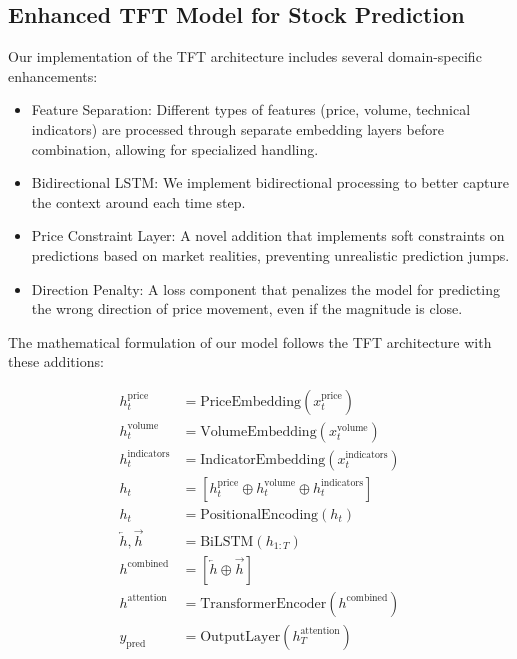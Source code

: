 \documentclass[conference]{IEEEtran}
\begin{document}
\subsection{Enhanced TFT Model for Stock Prediction}
Our implementation of the TFT architecture includes several domain-specific enhancements:

\begin{itemize}
\item Feature Separation: Different types of features (price, volume, technical indicators) are processed through separate embedding layers before combination, allowing for specialized handling.
\item Bidirectional LSTM: We implement bidirectional processing to better capture the context around each time step.
\item Price Constraint Layer: A novel addition that implements soft constraints on predictions based on market realities, preventing unrealistic prediction jumps.
\item Direction Penalty: A loss component that penalizes the model for predicting the wrong direction of price movement, even if the magnitude is close.
\end{itemize}

The mathematical formulation of our model follows the TFT architecture with these additions:

\begin{equation}
\begin{aligned}
h_{t}^{\text{price}} &= \text{PriceEmbedding}(x_{t}^{\text{price}}) \\
h_{t}^{\text{volume}} &= \text{VolumeEmbedding}(x_{t}^{\text{volume}}) \\
h_{t}^{\text{indicators}} &= \text{IndicatorEmbedding}(x_{t}^{\text{indicators}}) \\
h_{t} &= [h_{t}^{\text{price}} \oplus h_{t}^{\text{volume}} \oplus h_{t}^{\text{indicators}}] \\
h_{t} &= \text{PositionalEncoding}(h_{t}) \\
\overleftarrow{h}, \overrightarrow{h} &= \text{BiLSTM}(h_{1:T}) \\
h^{\text{combined}} &= [\overleftarrow{h} \oplus \overrightarrow{h}] \\
h^{\text{attention}} &= \text{TransformerEncoder}(h^{\text{combined}}) \\
y_{\text{pred}} &= \text{OutputLayer}(h^{\text{attention}}_{T}) \\
\end{aligned}
\end{equation}
\end{document}
